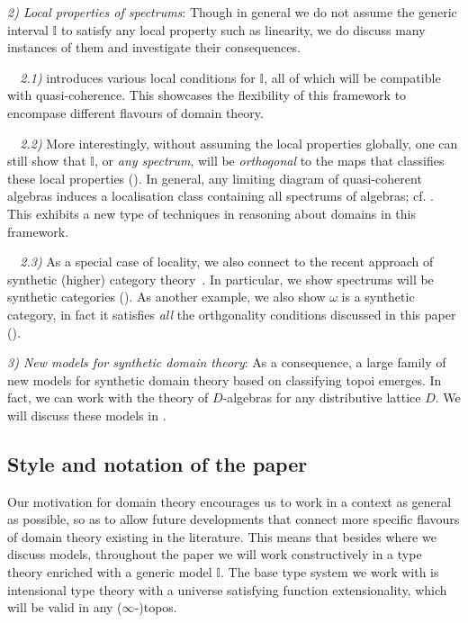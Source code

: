 \documentclass[12pt]{amsart}
\theoremstyle{definition}
\newcommand{\mbb}[1]{\mathbb{#1}}
\newcommand{\I}{\mbb I}
\begin{document}
\emph{2) Local properties of spectrums}: Though in general we do not assume the generic interval $\I$ to satisfy any local property such as linearity, we do discuss many instances of them and investigate their consequences.

\emph{\ \ 2.1)}  introduces various local conditions for $\I$, all of which will be compatible with quasi-coherence. This showcases the flexibility of this framework to encompase different flavours of domain theory.

\emph{\ \ 2.2)} More interestingly, without assuming the local properties globally, one can still show that $\I$, or \emph{any spectrum}, will be \emph{orthogonal} to the maps that classifies these local properties (). In general, any limiting diagram of quasi-coherent algebras induces a localisation class containing all spectrums of algebras; cf. . This exhibits a new type of techniques in reasoning about domains in this framework.

\emph{\ \ 2.3)} As a special case of locality, we also connect to the recent approach of synthetic (higher) category theory~\cite{riehl2017type,buchholtz2021synthetic,gratzer2024directed}. In particular, we show spectrums will be synthetic categories (). As another example, we also show $\omega$ is a synthetic category, in fact it satisfies \emph{all} the orthgonality conditions discussed in this paper (). 

\emph{3) New models for synthetic domain theory}: As a consequence, a large family of new models for synthetic domain theory based on classifying topoi emerges. In fact, we can work with the theory of $D$-algebras for any distributive lattice $D$. We will discuss these models in .

\subsection{Style and notation of the paper}

Our motivation for domain theory encourages us to work in a context as general as possible, so as to allow future developments that connect more specific flavours of domain theory existing in the literature. This means that besides  where we discuss models, throughout the paper we will work constructively in a type theory enriched with a generic model $\I$. The base type system we work with is intensional type theory with a universe satisfying function extensionality, which will be valid in any ($\infty$-)topos. 
\end{document}

